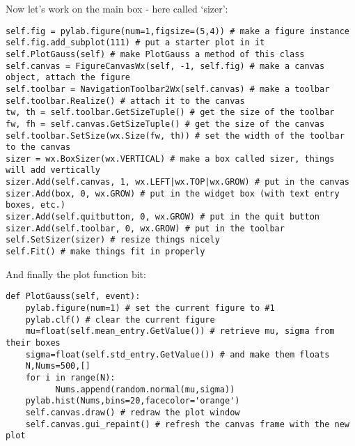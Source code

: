 {%


\noindent Now let's work on the  main box - here called `sizer':

{%
{\singlespacing \color{blue} \begin{verbatim}
self.fig = pylab.figure(num=1,figsize=(5,4)) # make a figure instance
self.fig.add_subplot(111) # put a starter plot in it
self.PlotGauss(self) # make PlotGauss a method of this class
self.canvas = FigureCanvasWx(self, -1, self.fig) # make a canvas object, attach the figure
self.toolbar = NavigationToolbar2Wx(self.canvas) # make a toolbar
self.toolbar.Realize() # attach it to the canvas
tw, th = self.toolbar.GetSizeTuple() # get the size of the toolbar
fw, fh = self.canvas.GetSizeTuple() # get the size of the canvas
self.toolbar.SetSize(wx.Size(fw, th)) # set the width of the toolbar to the canvas
sizer = wx.BoxSizer(wx.VERTICAL) # make a box called sizer, things will add vertically
sizer.Add(self.canvas, 1, wx.LEFT|wx.TOP|wx.GROW) # put in the canvas
sizer.Add(box, 0, wx.GROW) # put in the widget box (with text entry boxes, etc.)
sizer.Add(self.quitbutton, 0, wx.GROW) # put in the quit button
sizer.Add(self.toolbar, 0, wx.GROW) # put in the toolbar
self.SetSizer(sizer) # resize things nicely
self.Fit() # make things fit in properly
\end{verbatim}}
}


\noindent And finally  the plot function bit: 


{\singlespacing \color{blue} \begin{verbatim}
def PlotGauss(self, event):
    pylab.figure(num=1) # set the current figure to #1
    pylab.clf() # clear the current figure
    mu=float(self.mean_entry.GetValue()) # retrieve mu, sigma from their boxes
    sigma=float(self.std_entry.GetValue()) # and make them floats
    N,Nums=500,[]
    for i in range(N):
          Nums.append(random.normal(mu,sigma))
    pylab.hist(Nums,bins=20,facecolor='orange')
    self.canvas.draw() # redraw the plot window
    self.canvas.gui_repaint() # refresh the canvas frame with the new plot
\end{verbatim}}
}



